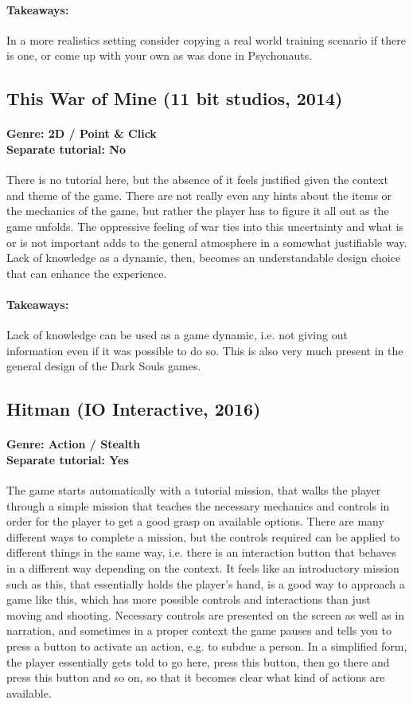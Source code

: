 \paragraph{Takeaways:}
In a more realistics setting consider copying a real world training scenario if there is one, or come up with your own as was done in Psychonauts.

\subsection{This War of Mine (11 bit studios, 2014)}
\paragraph{Genre: 2D / Point \& Click \\ Separate tutorial: No \\}
There is no tutorial here, but the absence of it feels justified given the context and theme of the game. There are not really even any hints about the items or the mechanics of the game, but rather the player has to figure it all out as the game unfolds. The oppressive feeling of war ties into this uncertainty and what is or is not important adds to the general atmosphere in a somewhat justifiable way. Lack of knowledge as a dynamic, then, becomes an understandable design choice that can enhance the experience.
\paragraph{Takeaways:}
Lack of knowledge can be used as a game dynamic, i.e. not giving out information even if it was possible to do so. This is also very much present in the general design of the Dark Souls games.

\subsection{Hitman (IO Interactive, 2016)}
\paragraph{Genre: Action / Stealth \\ Separate tutorial: Yes \\}
The game starts automatically with a tutorial mission, that walks the player through a simple mission that teaches the necessary mechanics and controls in order for the player to get a good grasp on available options. There are many different ways to complete a mission, but the controls required can be applied to different things in the same way, i.e. there is an interaction button that behaves in a different way depending on the context. It feels like an introductory mission such as this, that essentially holds the player's hand, is a good way to approach a game like this, which has more possible controls and interactions than just moving and shooting. Necessary controls are presented on the screen as well as in narration, and sometimes in a proper context the game pauses and tells you to press a button to activate an action, e.g. to subdue a person. In a simplified form, the player essentially gets told to go here, press this button, then go there and press this button and so on, so that it becomes clear what kind of actions are available.
